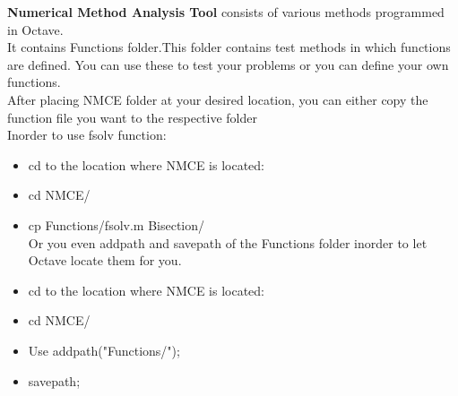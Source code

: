 \textbf{Numerical Method Analysis Tool} consists of various methods programmed in Octave.\\
It contains Functions folder.This folder contains test methods in which functions are defined. You can use these to test your problems or you can define your own functions.\\

After placing NMCE folder at your desired location, you can either copy the function file you want to the respective folder\\

Inorder to use fsolv function:\\

\begin{itemize}

\item cd to the location where NMCE is located:

\item cd NMCE/

\item cp Functions/fsolv.m Bisection/\\

Or you even addpath and savepath of the Functions folder inorder to let Octave locate them for you.

\item cd to the location where NMCE is located:

\item cd NMCE/

\item Use addpath("Functions/");

\item savepath;
\end{itemize}